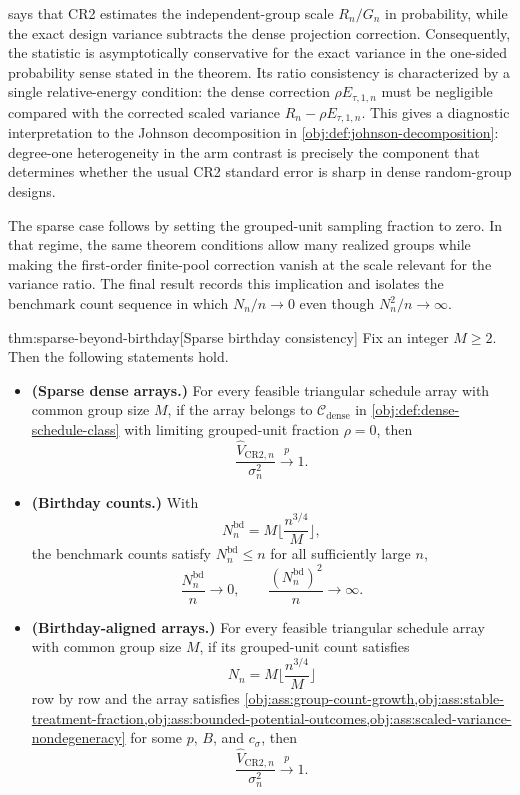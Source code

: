 \documentclass[11pt]{article}
\begin{document}
 says that CR2 estimates the independent-group scale \(R_n/G_n\) in probability, while the exact design variance subtracts the dense projection correction. Consequently, the statistic is asymptotically conservative for the exact variance in the one-sided probability sense stated in the theorem. Its ratio consistency is characterized by a single relative-energy condition: the dense correction \(\rho E_{\tau,1,n}\) must be negligible compared with the corrected scaled variance \(R_n-\rho E_{\tau,1,n}\). This gives a diagnostic interpretation to the Johnson decomposition in \cref{obj:def:johnson-decomposition}: degree-one heterogeneity in the arm contrast is precisely the component that determines whether the usual CR2 standard error is sharp in dense random-group designs.

The sparse case follows by setting the grouped-unit sampling fraction to zero. In that regime, the same theorem conditions allow many realized groups while making the first-order finite-pool correction vanish at the scale relevant for the variance ratio. The final result records this implication and isolates the benchmark count sequence in which \(N_n/n\to0\) even though \(N_n^2/n\to\infty\).

\begin{theoremv}{thm:sparse-beyond-birthday}[Sparse birthday consistency]
Fix an integer \(M\ge 2\).  Then the following statements hold.
\begin{itemize}
\item \textbf{(Sparse dense arrays.)} For every feasible triangular schedule array with common group size \(M\), if the array belongs to \(\mathcal C_{\mathrm{dense}}\) in \cref{obj:def:dense-schedule-class} with limiting grouped-unit fraction \(\rho=0\), then
\[
\frac{\widehat V_{\mathrm{CR2},n}}{\sigma_n^2}\xrightarrow{p}1 .
\]
\item \textbf{(Birthday counts.)} With
\[
N_n^{\mathrm{bd}}=M\Big\lfloor \frac{n^{3/4}}{M}\Big\rfloor ,
\]
the benchmark counts satisfy \(N_n^{\mathrm{bd}}\le n\) for all sufficiently large \(n\),
\[
\frac{N_n^{\mathrm{bd}}}{n}\to 0,
\qquad
\frac{(N_n^{\mathrm{bd}})^2}{n}\to\infty .
\]
\item \textbf{(Birthday-aligned arrays.)} For every feasible triangular schedule array with common group size \(M\), if its grouped-unit count satisfies
\[
N_n=M\Big\lfloor \frac{n^{3/4}}{M}\Big\rfloor
\]
row by row and the array satisfies \cref{obj:ass:group-count-growth,obj:ass:stable-treatment-fraction,obj:ass:bounded-potential-outcomes,obj:ass:scaled-variance-nondegeneracy} for some \(p\), \(B\), and \(c_\sigma\), then
\[
\frac{\widehat V_{\mathrm{CR2},n}}{\sigma_n^2}\xrightarrow{p}1 .
\]
\end{itemize}
\end{theoremv}
\end{document}
